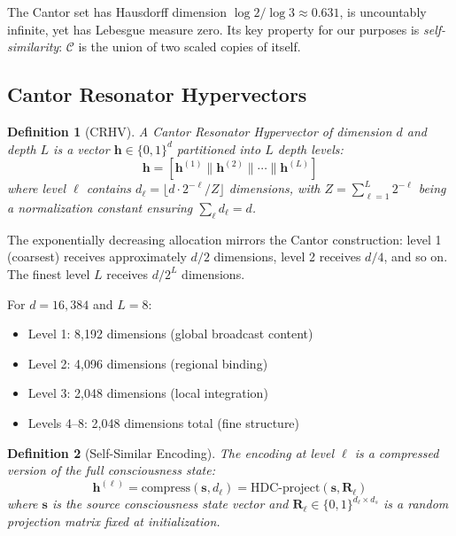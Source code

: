 \documentclass[11pt,a4paper]{article}
\newtheorem{definition}{Definition}
\begin{document}
The Cantor set has Hausdorff dimension $\log 2 / \log 3 \approx 0.631$, is uncountably infinite, yet has Lebesgue measure zero. Its key property for our purposes is \emph{self-similarity}: $\mathcal{C}$ is the union of two scaled copies of itself.

\subsection{Cantor Resonator Hypervectors}

\begin{definition}[CRHV]
A Cantor Resonator Hypervector of dimension $d$ and depth $L$ is a vector $\mathbf{h} \in \{0, 1\}^d$ partitioned into $L$ depth levels:
\begin{equation}
\mathbf{h} = [\mathbf{h}^{(1)} \| \mathbf{h}^{(2)} \| \cdots \| \mathbf{h}^{(L)}]
\end{equation}
where level $\ell$ contains $d_\ell = \lfloor d \cdot 2^{-\ell} / Z \rfloor$ dimensions, with $Z = \sum_{\ell=1}^{L} 2^{-\ell}$ being a normalization constant ensuring $\sum_\ell d_\ell = d$.
\end{definition}

The exponentially decreasing allocation mirrors the Cantor construction: level 1 (coarsest) receives approximately $d/2$ dimensions, level 2 receives $d/4$, and so on. The finest level $L$ receives $d/2^L$ dimensions.

For $d = 16{,}384$ and $L = 8$:
\begin{itemize}[nosep]
    \item Level 1: 8,192 dimensions (global broadcast content)
    \item Level 2: 4,096 dimensions (regional binding)
    \item Level 3: 2,048 dimensions (local integration)
    \item Levels 4--8: 2,048 dimensions total (fine structure)
\end{itemize}

\begin{definition}[Self-Similar Encoding]
The encoding at level $\ell$ is a compressed version of the full consciousness state:
\begin{equation}
\mathbf{h}^{(\ell)} = \text{compress}(\mathbf{s}, d_\ell) = \text{HDC-project}(\mathbf{s}, \mathbf{R}_\ell)
\end{equation}
where $\mathbf{s}$ is the source consciousness state vector and $\mathbf{R}_\ell \in \{0,1\}^{d_\ell \times d_s}$ is a random projection matrix fixed at initialization.
\end{definition}
\end{document}
